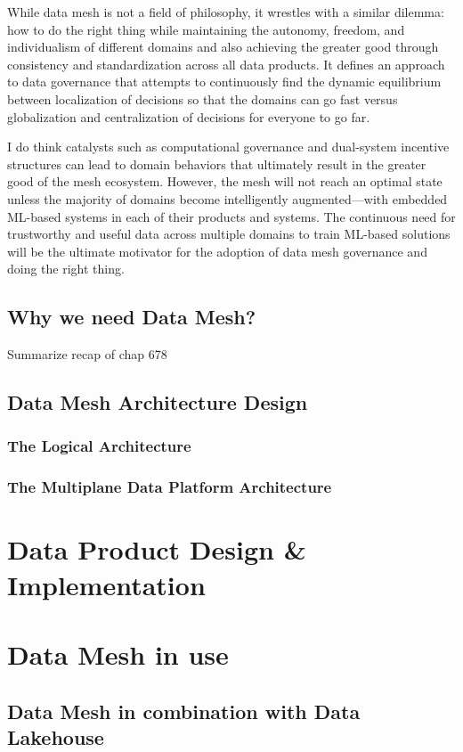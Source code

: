 \documentclass[12pt, a4paper]{book}
\begin{document}
While data mesh is not a field of philosophy, it wrestles with a similar dilemma: how to do the right thing while maintaining the autonomy, freedom, and individualism of different domains and also achieving the greater good through consistency and standardization across all data products. It defines an approach to data governance that attempts to continuously find the dynamic equilibrium between localization of decisions so that the domains can go fast versus globalization and centralization of decisions for everyone to go far.

I do think catalysts such as computational governance and dual-system incentive structures can lead to domain behaviors that ultimately result in the greater good of the mesh ecosystem. However, the mesh will not reach an optimal state unless the majority of domains become intelligently augmented—with embedded ML-based systems in each of their products and systems. The continuous need for trustworthy and useful data across multiple domains to train ML-based solutions will be the ultimate motivator for the adoption of data mesh governance and doing the right thing.

\section{Why we need Data Mesh?}
Summarize recap of chap 678

\section{Data Mesh Architecture Design}
\subsection{The Logical Architecture}

\subsection{The Multiplane Data Platform Architecture}
\chapter{Data Product Design \& Implementation}

\chapter{Data Mesh in use}
\section{Data Mesh in combination with Data Lakehouse}
\end{document}
